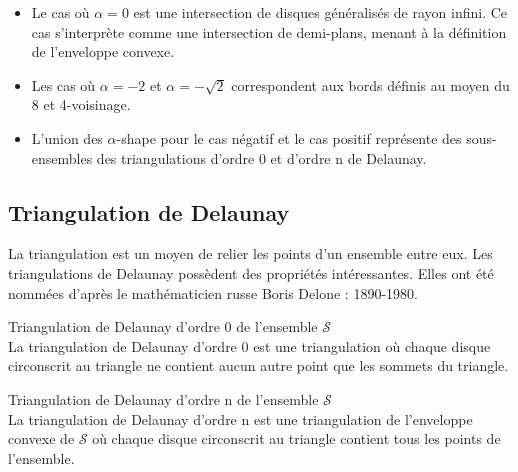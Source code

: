 \begin{itemize}
  \item Le cas où $\alpha = 0$ est une intersection de disques généralisés de rayon infini. Ce cas s'interprète comme une intersection de demi-plans, menant à la définition de l'enveloppe convexe.
  \item Les cas où $\alpha = -2$ et $\alpha = -\sqrt{2}$ correspondent aux bords définis au moyen du 8 et 4-voisinage. 
  \item L'union des $\alpha$-shape \cite{EdeKirSei83} pour le cas négatif et le cas positif représente des sous-ensembles des triangulations d'ordre 0 et d'ordre n de Delaunay.   
\end{itemize}
 
\subsection{Triangulation de Delaunay}

La triangulation est un moyen de relier les points d'un ensemble entre eux. Les triangulations de Delaunay possèdent des propriétés intéressantes.  Elles ont été nommées d'après le mathématicien russe Boris Delone : 1890-1980.

\begin{Definition}{Triangulation de Delaunay d'ordre 0 de l'ensemble $\mathcal{S}$}\\
\label{def:tri-del-0}
  La triangulation de Delaunay d'ordre 0 est une triangulation où chaque disque circonscrit au triangle ne contient aucun autre point que les sommets du triangle.
\end{Definition}

\begin{Definition}{Triangulation de Delaunay d'ordre n de l'ensemble $\mathcal{S}$}\\
\label{def:tri-del-n}
  La triangulation de Delaunay d'ordre n est une triangulation de l'enveloppe convexe de $\mathcal{S}$ où chaque disque circonscrit au triangle contient tous les points de l'ensemble.
\end{Definition}

